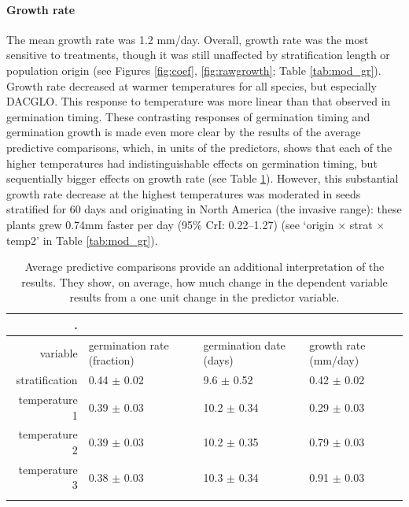 \documentclass[12pt]{article}\usepackage[]{graphicx}\usepackage[]{color}
\begin{document}
	\paragraph{Growth rate} The mean growth rate was 1.2 mm/day. Overall, growth rate was the most sensitive to treatments, though it was still unaffected by stratification length or population origin (see Figures \ref{fig:coef}, \ref{fig:rawgrowth}; Table \ref{tab:mod_gr}). Growth rate decreased at warmer temperatures for all species, but especially DACGLO. This response to temperature was more linear than that observed in germination timing. These contrasting responses of germination timing and germination growth is made even more clear by the results of the average predictive comparisons, which, in units of the predictors, shows that each of the higher temperatures had indistinguishable effects on germination timing, but sequentially bigger effects on growth rate (see Table \ref{tab:apc}).  However, this substantial growth rate decrease at the highest temperatures was moderated in seeds stratified for 60 days and originating in North America (the invasive range): these plants grew 0.74mm faster per day (95\% CrI: 0.22--1.27) (see `origin $\times$ strat $\times$ temp2' in Table \ref{tab:mod_gr}). %

\begin{longtable}{rlll} %
\caption{Average predictive comparisons provide an additional interpretation of the results. They show, on average, how much change in the dependent variable results from a one unit change in the predictor variable.}.
\label{tab:apc}\\
	\hline
	variable & germination rate (fraction) & germination date (days) & growth rate (mm/day) \\ 
	\hline
	stratification & 0.44 $\pm$ 0.02 & 9.6 $\pm$ 0.52 & 0.42 $\pm$ 0.02 \\ 
	temperature 1 & 0.39 $\pm$ 0.03 & 10.2 $\pm$ 0.34 & 0.29 $\pm$ 0.03 \\ 
	temperature 2 & 0.39 $\pm$ 0.03 & 10.2 $\pm$ 0.35 & 0.79 $\pm$ 0.03 \\ 
	temperature 3 & 0.38 $\pm$ 0.03 & 10.3 $\pm$ 0.34 & 0.91 $\pm$ 0.03 \\ 
	\hline\\
	\hline
\end{longtable}
\end{document}
